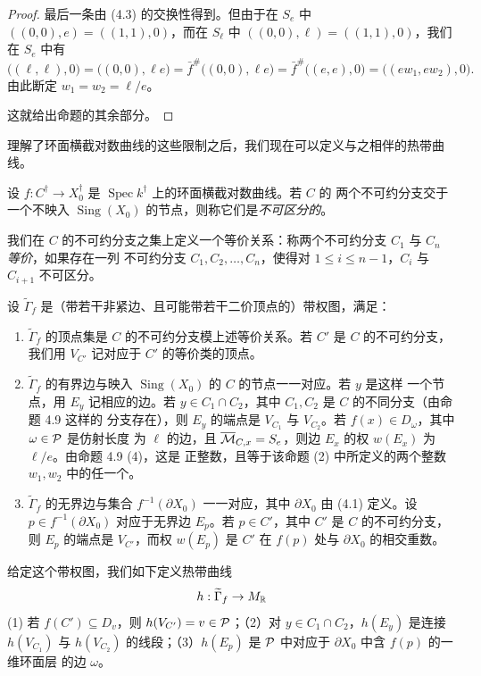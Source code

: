 \begin{proof}
最后一条由 (4.3) 的交换性得到。但由于在 $S_e$ 中 $((0,0),e) = ((1,1),0)$，而在 $S_\ell$ 中
$((0,0),\ell) = ((1,1),0)$，我们在 $S_e$ 中有
\[
\bigl((\ell,\ell),0\bigr) = \bigl((0,0),\ell e\bigr)
= \bar f^{\#}\bigl((0,0),\ell e\bigr) = \bar f^{\#}\bigl((e,e),0\bigr)
= \bigl((ew_1,ew_2),0\bigr).
\]
由此断定 $w_1 = w_2 = \ell/e$。

这就给出命题的其余部分。
\end{proof}

理解了环面横截对数曲线的这些限制之后，我们现在可以定义与之相伴的热带曲线。

\begin{definition}
设 $f : C^{\dagger} \to X_0^{\dagger}$ 是 $\operatorname{Spec}k^{\dagger}$ 上的环面横截对数曲线。若 $C$ 的
两个不可约分支交于一个不映入 $\operatorname{Sing}(X_0)$ 的节点，则称它们是\emph{不可区分的}。

我们在 $C$ 的不可约分支之集上定义一个等价关系：称两个不可约分支 $C_1$ 与 $C_n$ \emph{等价}，如果存在一列
不可约分支 $C_1,C_2,\dots,C_n$，使得对 $1\le i\le n-1$，$C_i$ 与 $C_{i+1}$ 不可区分。

设 $\widetilde{\Gamma}_f$ 是（带若干非紧边、且可能带若干二价顶点的）带权图，满足：
\begin{enumerate}[label=(\arabic*),leftmargin=*]
\item $\widetilde{\Gamma}_f$ 的顶点集是 $C$ 的不可约分支模上述等价关系。若 $C'$ 是 $C$ 的不可约分支，我们用
$V_{C'}$ 记对应于 $C'$ 的等价类的顶点。
\item $\widetilde{\Gamma}_f$ 的有界边与映入 $\operatorname{Sing}(X_0)$ 的 $C$ 的节点一一对应。若 $y$ 是这样
一个节点，用 $E_y$ 记相应的边。若 $y\in C_1\cap C_2$，其中 $C_1,C_2$ 是 $C$ 的不同分支（由命题 4.9 这样的
分支存在），则 $E_y$ 的端点是 $V_{C_1}$ 与 $V_{C_2}$。若 $f(x)\in D_\omega$，其中 $\omega\in\mathcal{P}$ 是仿射长度
为 $\ell$ 的边，且 $\overline{\mathcal{M}}_{C,x} = S_e$，则边 $E_x$ 的权 $w(E_x)$ 为 $\ell/e$。由命题 4.9 (4)，这是
正整数，且等于该命题 (2) 中所定义的两个整数 $w_1,w_2$ 中的任一个。
\item $\widetilde{\Gamma}_f$ 的无界边与集合 $f^{-1}(\partial X_0)$ 一一对应，其中 $\partial X_0$ 由 (4.1)
定义。设 $p\in f^{-1}(\partial X_0)$ 对应于无界边 $E_p$。若 $p\in C'$，其中 $C'$ 是 $C$ 的不可约分支，则
$E_p$ 的端点是 $V_{C'}$，而权 $w(E_p)$ 是 $C'$ 在 $f(p)$ 处与 $\partial X_0$ 的相交重数。
\end{enumerate}
给定这个带权图，我们如下定义热带曲线
\[
h : \widetilde{\Gamma}_f \to M_{\mathbb{R}}
\]
(1) 若 $f(C')\subseteq D_v$，则 $h(V_{C'}) = v\in\mathcal{P}$；（2）对 $y\in C_1\cap C_2$，$h(E_y)$ 是连接
$h(V_{C_1})$ 与 $h(V_{C_2})$ 的线段；（3）$h(E_p)$ 是 $\mathcal{P}$ 中对应于 $\partial X_0$ 中含 $f(p)$ 的一维环面层
的边 $\omega$。
\end{definition}

